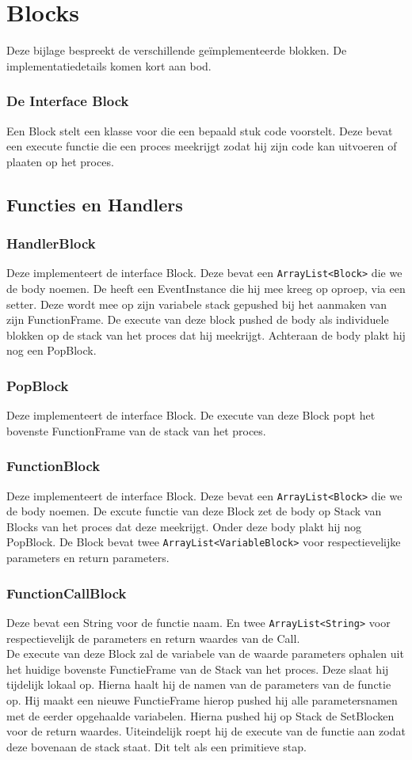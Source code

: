 \documentclass[]{article}
\begin{document}
\section{Blocks}
\label{bijlageblok}
Deze bijlage bespreekt de verschillende ge\"implementeerde blokken. De implementatiedetails komen kort aan bod.
\subsubsection{De Interface Block}
Een Block stelt een klasse voor die een bepaald stuk code voorstelt. Deze bevat een execute functie die een proces meekrijgt zodat hij zijn code kan uitvoeren of plaaten op het proces.

\subsection{Functies en Handlers}
\subsubsection{HandlerBlock}
Deze implementeert de interface Block. Deze bevat een \texttt{ArrayList<Block>} \cite{arraylist} die we de body noemen. De heeft een EventInstance die hij mee kreeg op oproep, via een setter. Deze wordt mee op zijn variabele stack gepushed bij het aanmaken van zijn FunctionFrame. De execute van deze block pushed de body als individuele blokken op de stack van het proces dat hij meekrijgt. Achteraan de body plakt hij nog een PopBlock.
\subsubsection{PopBlock}
Deze implementeert de interface Block. De execute van deze Block popt het bovenste FunctionFrame van de stack van het proces.
\subsubsection{FunctionBlock}
Deze implementeert de interface Block. Deze bevat een \texttt{ArrayList<Block>} \cite{arraylist} die we de body noemen. De excute functie van deze Block zet de body op Stack van Blocks van het proces dat deze meekrijgt. Onder deze body plakt hij nog PopBlock. De Block bevat twee \texttt{ArrayList<VariableBlock>} \cite{arraylist} voor respectievelijke parameters en return parameters.
\subsubsection{FunctionCallBlock}
Deze bevat een String voor de functie naam. En twee \texttt{ArrayList<String>} \cite{arraylist} voor respectievelijk de parameters en return waardes van de Call.\\ De execute van deze Block zal de variabele van de waarde parameters ophalen uit het huidige bovenste FunctieFrame van de Stack van het proces. Deze slaat hij tijdelijk lokaal op. Hierna haalt hij de namen van de parameters van de functie op. Hij maakt een nieuwe FunctieFrame hierop pushed hij alle parametersnamen met de eerder opgehaalde variabelen. Hierna pushed hij op Stack de SetBlocken voor de return waardes. Uiteindelijk roept hij de execute van de functie aan zodat deze bovenaan de stack staat. Dit telt als een primitieve stap.
\end{document}
